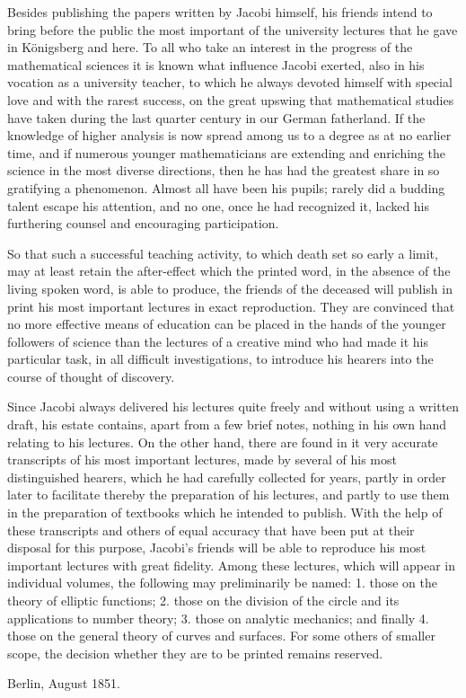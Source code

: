 \documentclass[11pt]{article}
\begin{document}
Besides publishing the papers written by Jacobi himself, his friends intend to bring before the public the most important of the university lectures that he gave in Königsberg and here. To all who take an interest in the progress of the mathematical sciences it is known what influence Jacobi exerted, also in his vocation as a university teacher, to which he always devoted himself with special love and with the rarest success, on the great upswing that mathematical studies have taken during the last quarter century in our German fatherland. If the knowledge of higher analysis is now spread among us to a degree as at no earlier time, and if numerous younger mathematicians are extending and enriching the science in the most diverse directions, then he has had the greatest share in so gratifying a phenomenon. Almost all have been his pupils; rarely did a budding talent escape his attention, and no one, once he had recognized it, lacked his furthering counsel and encouraging participation.

So that such a successful teaching activity, to which death set so early a limit, may at least retain the after-effect which the printed word, in the absence of the living spoken word, is able to produce, the friends of the deceased will publish in print his most important lectures in exact reproduction. They are convinced that no more effective means of education can be placed in the hands of the younger followers of science than the lectures of a creative mind who had made it his particular task, in all difficult investigations, to introduce his hearers into the course of thought of discovery.

Since Jacobi always delivered his lectures quite freely and without using a written draft, his estate contains, apart from a few brief notes, nothing in his own hand relating to his lectures. On the other hand, there are found in it very accurate transcripts of his most important lectures, made by several of his most distinguished hearers, which he had carefully collected for years, partly in order later to facilitate thereby the preparation of his lectures, and partly to use them in the preparation of textbooks which he intended to publish. With the help of these transcripts and others of equal accuracy that have been put at their disposal for this purpose, Jacobi's friends will be able to reproduce his most important lectures with great fidelity. Among these lectures, which will appear in individual volumes, the following may preliminarily be named: 1. those on the theory of elliptic functions; 2. those on the division of the circle and its applications to number theory; 3. those on analytic mechanics; and finally 4. those on the general theory of curves and surfaces. For some others of smaller scope, the decision whether they are to be printed remains reserved.

\begin{flushleft}
Berlin, August 1851.
\end{flushleft}
\end{document}
